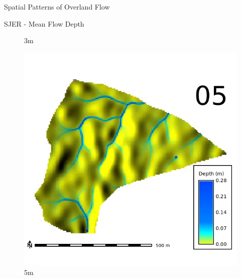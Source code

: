 \documentclass[
  ignorenonframetext,
]{beamer}
\begin{document}
\begin{frame}{Spatial Patterns of Overland Flow}
\begin{block}{SJER - Mean Flow Depth}
\begin{figure}[H]
{}

\caption{3m}

\end{figure}%

\begin{figure}[H]

{\centering \includegraphics{../output/SJER/sensitivity_1/SJER_depth_5_025_s_average.webp}

}

\caption{5m}

\end{figure}%

\begin{figure}[H]


\end{figure}
\end{block}
\end{frame}
\end{document}
